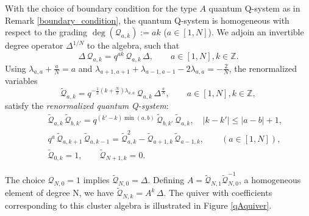 \documentclass[12pt]{amsart}
\newcommand{\Z}{{\mathbb Z}}
\newcommand{\Q}{{\mathcal Q}}
\numberwithin{equation}{section}
\numberwithin{table}{section}
\begin{document}
With the choice of boundary condition for the type $A$ quantum Q-system as in Remark \ref{boundary_condition}, the quantum Q-system is homogeneous with respect to the grading $\deg(\Q_{a,k}):=a k$ ($a\in[1,N]$). 
We adjoin an invertible degree operator $\Delta^{1/N}$ to the algebra, such that
$$\Delta\, \Q_{a,k}=q^{ak}\, \Q_{a,k}\,\Delta, \qquad a\in [1,N],k\in \Z .$$
Using $\lambda_{a,a}+\frac{a}{N}=a$ and $\lambda_{a+1,a+1}+\lambda_{a-1,a-1}-2\lambda_{a,a}=-\frac{2}{N}$,
the renormalized variables
\begin{equation}\label{renorm} \widetilde\Q_{a,k}=q^{-\frac{1}{2}(k+\frac{N}{2})\lambda_{a,a}}\, \Q_{a,k} \, \Delta^\frac{a}{N}  ,\qquad a\in [1,N], k\in \Z ,
\end{equation}
satisfy the
{\it renormalized quantum Q-system}:
\begin{eqnarray}
&&\widetilde\Q_{a,k}\,\widetilde\Q_{b,k'}= q^{(k'-k){\min}(a,b)} \, \widetilde\Q_{b,k'}\,\widetilde\Q_{a,k},\quad |k-k'| \leq |a-b|+1,\nonumber \\
&&q^a\, \widetilde\Q_{a,k+1}\, \widetilde\Q_{a,k-1} =\widetilde\Q_{a,k}^2- \widetilde\Q_{a+1,k}\, \widetilde\Q_{a-1,k} ,\qquad (a\in [1,N]),\label{Msys}\\
&&\widetilde\Q_{0,k}=1,\qquad \widetilde\Q_{N+1,k}=0.\nonumber
\end{eqnarray}

The choice $\Q_{N,0}=1$ implies $\widetilde\Q_{N,0}=\Delta$.
Defining $A=\widetilde\Q_{N,1}\widetilde\Q_{N,0}^{-1}$, a homogeneous element of degree N, we have $\widetilde\Q_{N,k}=A^k\, \Delta$. The quiver with coefficients corresponding to this cluster algebra is illustrated in Figure \ref{qAquiver}.
\end{document}
